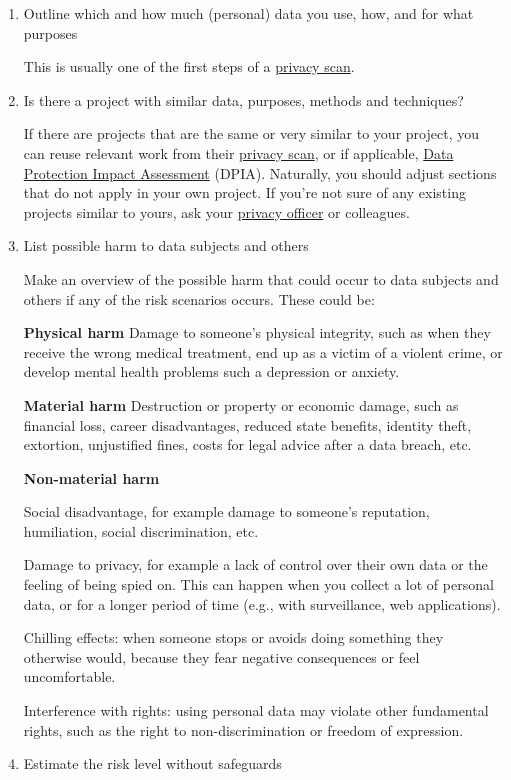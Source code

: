\documentclass[
]{book}
\begin{document}
\begin{enumerate}
\def\labelenumi{\arabic{enumi}.}
\item
  Outline which and how much (personal) data you use, how,
  and for what purposes

  This is usually one of the first steps of a \protect\hyperlink{privacy-scan}{privacy scan}.
\item
  Is there a project with similar data, purposes, methods and
  techniques?

  If there are projects that are the same or very similar to your project,
  you can reuse relevant work from their \protect\hyperlink{privacy}{privacy scan}, or if
  applicable, \protect\hyperlink{dpia}{Data Protection Impact Assessment} (DPIA). Naturally, you
  should adjust sections that do not apply in your own project. If you're not
  sure of any existing projects similar to yours, ask your
  \protect\hyperlink{support}{privacy officer} or colleagues.
\item
  List possible harm to data subjects and others

  Make an overview of the possible harm that could occur to data subjects and
  others if any of the risk scenarios occurs. These could be:

  \textbf{Physical harm}
  Damage to someone's physical integrity, such as when they receive the wrong
  medical treatment, end up as a victim of a violent crime, or develop mental
  health problems such a depression or anxiety.

  \textbf{Material harm}
  Destruction or property or economic damage, such as financial loss, career
  disadvantages, reduced state benefits, identity theft, extortion, unjustified
  fines, costs for legal advice after a data breach, etc.

  \textbf{Non-material harm}

  Social disadvantage, for example damage to someone's reputation,
  humiliation, social discrimination, etc.

  Damage to privacy, for example a lack of control over their own data
  or the feeling of being spied on. This can happen when you collect a lot
  of personal data, or for a longer period of time (e.g., with surveillance,
  web applications).

  Chilling effects: when someone stops or avoids doing something they
  otherwise would, because they fear negative consequences or feel
  uncomfortable.

  Interference with rights: using personal data may violate other
  fundamental rights, such as the right to non-discrimination or freedom of
  expression.
\item
  Estimate the risk level without safeguards


\end{enumerate}
\end{document}
